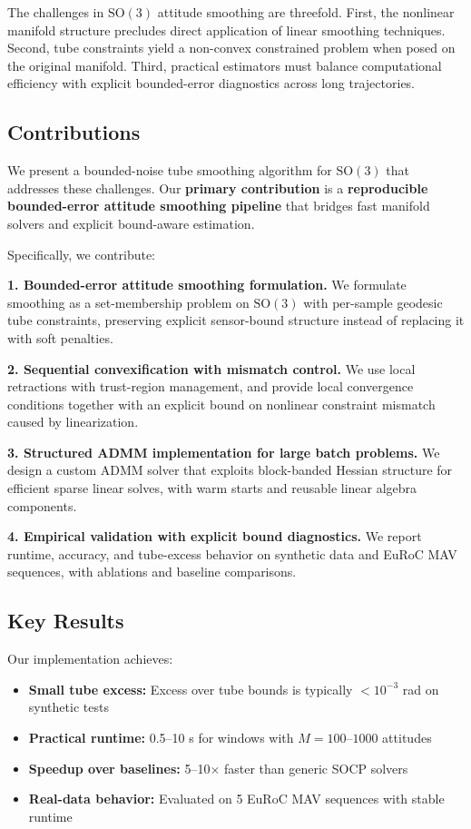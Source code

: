 \documentclass[letterpaper, 10 pt, conference]{ieeeconf}
\newcommand{\SO}{\mathrm{SO}(3)}
\begin{document}
The challenges in $\SO$ attitude smoothing are threefold. First, the nonlinear manifold structure precludes direct application of linear smoothing techniques. Second, tube constraints yield a non-convex constrained problem when posed on the original manifold. Third, practical estimators must balance computational efficiency with explicit bounded-error diagnostics across long trajectories.

\subsection{Contributions}

We present a bounded-noise tube smoothing algorithm for $\SO$ that addresses these challenges. Our \textbf{primary contribution} is a \textbf{reproducible bounded-error attitude smoothing pipeline} that bridges fast manifold solvers and explicit bound-aware estimation.

Specifically, we contribute:

\textbf{1. Bounded-error attitude smoothing formulation.} We formulate smoothing as a set-membership problem on $\SO$ with per-sample geodesic tube constraints, preserving explicit sensor-bound structure instead of replacing it with soft penalties.

\textbf{2. Sequential convexification with mismatch control.} We use local retractions with trust-region management, and provide local convergence conditions together with an explicit bound on nonlinear constraint mismatch caused by linearization.

\textbf{3. Structured ADMM implementation for large batch problems.} We design a custom ADMM solver that exploits block-banded Hessian structure for efficient sparse linear solves, with warm starts and reusable linear algebra components.

\textbf{4. Empirical validation with explicit bound diagnostics.} We report runtime, accuracy, and tube-excess behavior on synthetic data and EuRoC MAV sequences, with ablations and baseline comparisons.

\subsection{Key Results}

Our implementation achieves:
\begin{itemize}
\item \textbf{Small tube excess:} Excess over tube bounds is typically $<10^{-3}$ rad on synthetic tests
\item \textbf{Practical runtime:} 0.5--10 s for windows with $M=100$--$1000$ attitudes
\item \textbf{Speedup over baselines:} 5--10$\times$ faster than generic SOCP solvers
\item \textbf{Real-data behavior:} Evaluated on 5 EuRoC MAV sequences with stable runtime
\end{itemize}
\end{document}
